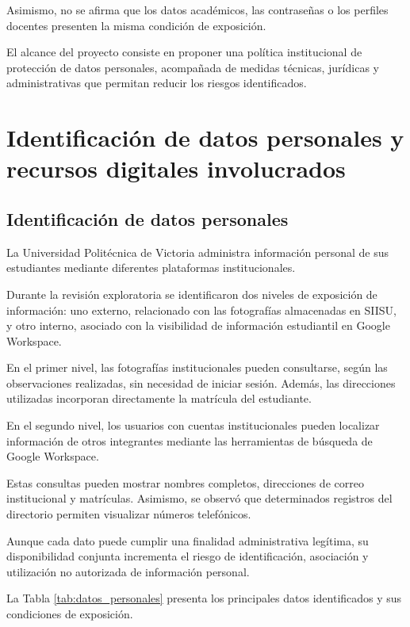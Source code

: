 \documentclass[12pt]{article}
\begin{document}
Asimismo, no se afirma que los datos
académicos, las contraseñas o los perfiles
docentes presenten la misma condición
de exposición.

El alcance del proyecto consiste en
proponer una política institucional
de protección de datos personales,
acompañada de medidas técnicas,
jurídicas y administrativas que
permitan reducir los riesgos
identificados.




\section{Identificación de datos personales
y recursos digitales involucrados}

\subsection{Identificación de datos personales}

La Universidad Politécnica de Victoria
administra información personal de sus
estudiantes mediante diferentes
plataformas institucionales.

Durante la revisión exploratoria se
identificaron dos niveles de exposición
de información: uno externo, relacionado
con las fotografías almacenadas en SIISU,
y otro interno, asociado con la
visibilidad de información estudiantil
en Google Workspace.

En el primer nivel, las fotografías
institucionales pueden consultarse,
según las observaciones realizadas,
sin necesidad de iniciar sesión.
Además, las direcciones utilizadas
incorporan directamente la matrícula
del estudiante.

En el segundo nivel, los usuarios
con cuentas institucionales pueden
localizar información de otros
integrantes mediante las herramientas
de búsqueda de Google Workspace.

Estas consultas pueden mostrar nombres
completos, direcciones de correo
institucional y matrículas. Asimismo,
se observó que determinados registros
del directorio permiten visualizar
números telefónicos.

Aunque cada dato puede cumplir
una finalidad administrativa legítima,
su disponibilidad conjunta incrementa
el riesgo de identificación, asociación
y utilización no autorizada de
información personal.

La Tabla \ref{tab:datos_personales}
presenta los principales datos
identificados y sus condiciones
de exposición.
\end{document}
